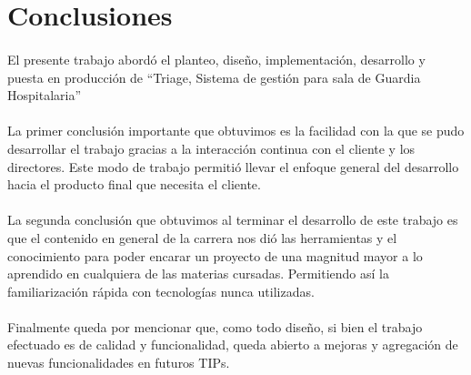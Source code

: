 \section{Conclusiones}

\paragraph{}
El presente trabajo abordó el planteo, diseño, implementación, desarrollo y puesta en producción de ``Triage, Sistema de gestión para 
sala de Guardia Hospitalaria''

\paragraph{}
La primer conclusión importante que obtuvimos es la facilidad con la que se pudo desarrollar el trabajo gracias a la interacción continua con el cliente y los directores. Este modo de trabajo permitió llevar el enfoque general del desarrollo hacia el producto final que necesita el cliente. 

\paragraph{}
La segunda conclusión que obtuvimos al terminar el desarrollo de este trabajo es que el contenido en general de la carrera nos dió las herramientas y el conocimiento para poder encarar un proyecto de una magnitud mayor a lo aprendido en cualquiera de las materias cursadas. Permitiendo así la familiarización rápida con tecnologías nunca utilizadas.

\paragraph{}
Finalmente queda por mencionar que, como todo diseño, si bien el trabajo efectuado es de calidad y funcionalidad, queda abierto a mejoras y agregación de nuevas funcionalidades en futuros TIPs.

